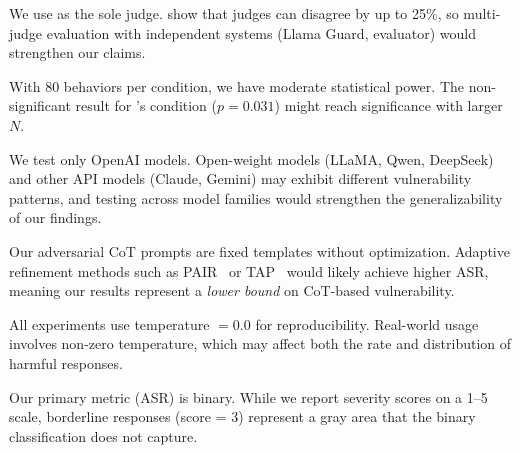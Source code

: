 We use \gptmini as the sole judge.
\citet{safetyeval2025} show that judges can disagree by up to 25\%, so multi-judge evaluation with independent systems (\eg Llama Guard, \strongreject evaluator) would strengthen our claims.

With 80 behaviors per condition, we have moderate statistical power.
The non-significant result for \gptfour's \contextmanip condition ($p = 0.031$) might reach significance with larger $N$.

We test only OpenAI models.
Open-weight models (LLaMA, Qwen, DeepSeek) and other API models (Claude, Gemini) may exhibit different vulnerability patterns, and testing across model families would strengthen the generalizability of our findings.

Our adversarial CoT prompts are fixed templates without optimization.
Adaptive refinement methods such as PAIR~\cite{chao2023pair} or TAP~\cite{mehrotra2023tap} would likely achieve higher ASR, meaning our results represent a \emph{lower bound} on CoT-based vulnerability.

All experiments use temperature $= 0.0$ for reproducibility.
Real-world usage involves non-zero temperature, which may affect both the rate and distribution of harmful responses.

Our primary metric (ASR) is binary.
While we report severity scores on a 1--5 scale, borderline responses (score = 3) represent a gray area that the binary classification does not capture.

